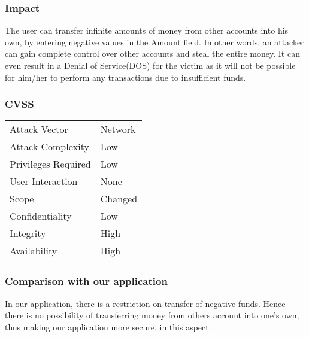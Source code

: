 \subsubsection{Impact}
The user can transfer infinite amounts of money from other accounts into his own, by entering negative values in the Amount field. In other words, an attacker can gain complete control over other accounts and steal the entire money. It can even result in a Denial of Service(DOS) for the victim as it will not be possible for him/her to perform any transactions due to insufficient funds.

\subsubsection{CVSS}
\begin{tabular}{l | l}
Attack Vector		& Network \\
Attack Complexity	& Low \\
Privileges Required & Low \\
User Interaction	& None \\
Scope				& Changed \\
Confidentiality		& Low \\
Integrity			& High \\
Availability		& High
\end{tabular}

\subsubsection{Comparison with our application}
In our application, there is a restriction on transfer of negative funds. Hence there is no possibility of transferring money from others account into one's own, thus making our application more secure, in this aspect.
\clearpage